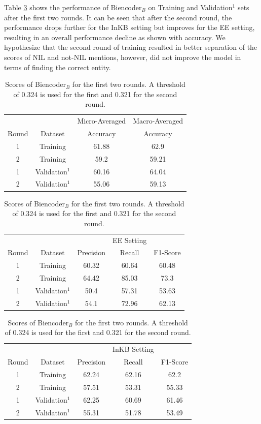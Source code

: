 \documentclass{report}
\theoremstyle{definition}
\theoremstyle{remark}
\begin{document}
Table \ref{tab:biencoderbres} shows the performance of Biencoder$_B$ on Training and Validation$^1$ sets after the first two rounds. It can be seen that after the second round, the performance drops further for the InKB setting but improves for the EE setting, resulting in an overall performance decline as shown with accuracy. We hypothesize that the second round of training resulted in better separation of the scores of NIL and not-NIL mentions, however, did not improve the model in terms of finding the correct entity. 


\begin{table}[H]
    \centering
    \begin{tabular}{cccc}
    &&Micro-Averaged & Macro-Averaged\\
    Round    & Dataset & Accuracy &Accuracy \\
    \hline
    1  & Training & 61.88&62.9\\
    2  & Training & 59.2&	59.21\\
    1  & Validation$^1$ & 60.16	&64.04\\
    2  & Validation$^1$ & 55.06	&59.13\\
    \end{tabular}
    
    \vspace{0.5cm}\begin{tabular}{ccccc}
    &&&EE Setting & \\
    Round    & Dataset & Precision & Recall & F1-Score \\
    \hline
    1  & Training &60.32&	60.64&	60.48 \\
    2  & Training &64.42&	85.03&	73.3 \\
    1  & Validation$^1$ &50.4&	57.31&	53.63 \\
    2  & Validation$^1$ &54.1&	72.96&	62.13\\
    \end{tabular}
    
    \vspace{0.5cm}\begin{tabular}{ccccc}
    &&&InKB Setting & \\
    Round    & Dataset & Precision & Recall & F1-Score \\
    \hline
    1  & Training &62.24&62.16	&62.2\\
    2  & Training &57.51&53.31	&55.33\\
    1  & Validation$^1$ &62.25&60.69	&61.46 \\
    2  & Validation$^1$ &55.31&51.78	&53.49\\
    \end{tabular}
    
    \caption{Scores of Biencoder$_B$ for the first two rounds. A threshold of 0.324 is used for the first and 0.321 for the second round.}
    \label{tab:biencoderbres}
\end{table}
\end{document}
